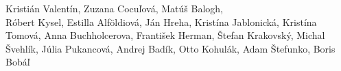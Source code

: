Kristián Valentín, Zuzana Cocuľová, Matúš Balogh,\\
Róbert Kysel, Estilla Alföldiová, Ján Hreha, Kristína Jablonická,
Kristína Tomová, Anna Buchholcerova, František Herman, Štefan Krakovský, Michal Švehlík, Júlia Pukancová, Andrej Badík, Otto Kohulák, Adam Štefunko, Boris Bobáľ
